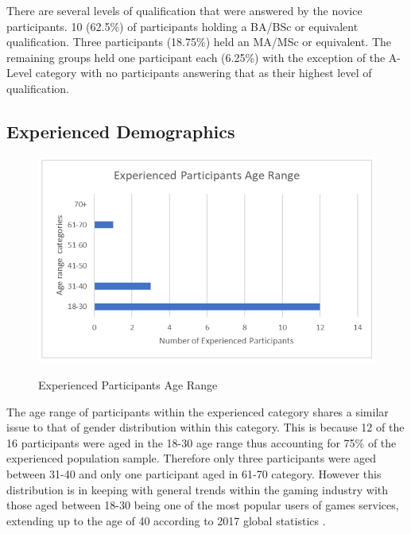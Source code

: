 There are several levels of qualification that were answered by the novice participants. 10 (62.5\%) of participants holding a BA/BSc or equivalent qualification. Three participants (18.75\%) held an MA/MSc or equivalent. The remaining groups held one participant each (6.25\%) with the exception of the A-Level category with no participants answering that as their highest level of qualification.

\subsection{Experienced Demographics}
\begin{figure}[H]
\includegraphics[width=\linewidth]{Screenshots/DemographicsQuestionaires/experiencedAgeRange.png}
\label{ExperiencedAges}
\caption{Experienced Participants Age Range}
\end{figure}

The age range of participants within the experienced category shares a similar issue to that of gender distribution within this category. This is because 12 of the 16 participants were aged in the 18-30 age range thus accounting for 75\% of the experienced population sample. Therefore only three participants were aged between 31-40 and only one participant aged in 61-70 category. However this distribution is in keeping with general trends within the gaming industry with those aged between 18-30 being one of the most popular users of games services, extending up to the age of 40 according to 2017 global statistics \citep{gamersChristinaGough2017}. 

